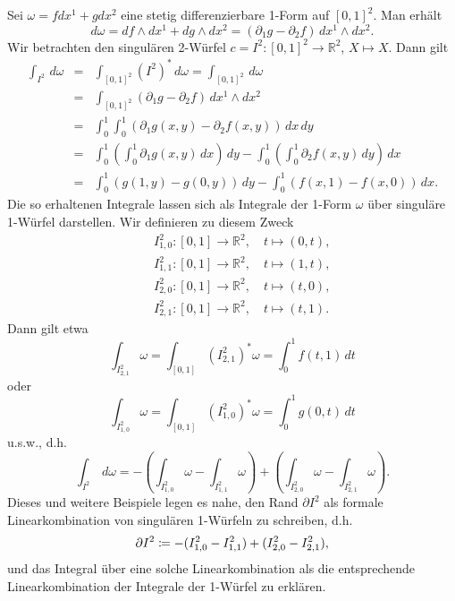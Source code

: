 \documentclass[a4paper,twoside,DIV15,BCOR12mm]{scrbook}
\begin{document}
\bigskip

 Sei $\omega = fdx^{1} + gdx^{2}$ eine stetig 
differenzierbare 1-Form auf $[0,1]^{2}$. Man erhält
\[ d\omega = df \wedge dx^{1} + dg \wedge dx^{2} = (\partial_{1} g - 
\partial_{2} f) \, dx^{1} \wedge dx^{2}. \]
Wir betrachten den singulären 2-Würfel $c = I^{2}: [0,1]^{2} \to 
{\mathbb R}^{2}$, $X \mapsto X$. Dann gilt
\begin{eqnarray*}
\int_{I^{2}} \, d\omega & = & \int_{[0,1]^{2}} (I^{2})^{*} \, 
d\omega = \int_{[0,1]^{2}} \, d\omega \\
& = & \int_{[0,1]^{2}} (\partial_{1}g - \partial_{2} f) \, dx^{1} 
\wedge dx^{2} \\
& = & \int_{0}^{1} \int_{0}^{1} (\partial_{1}g(x,y) - 
\partial_{2}f(x,y))\, dx\, dy \\
& = & \int_{0}^{1}\left(\int_{0}^{1} \partial_{1}g(x,y)\, dx \right)\, 
dy - \int_{0}^{1} \left(\int_{0}^{1} \partial_{2}f(x,y)\, dy \right) 
\, dx \\
& = & \int_{0}^{1}(g(1,y) - g(0,y))\, dy - \int_{0}^{1}(f(x,1) - 
f(x,0))\, dx .
\end{eqnarray*}
Die so erhaltenen Integrale lassen sich als Integrale der 1-Form 
$\omega$ über singuläre 1-Würfel darstellen. Wir definieren zu diesem Zweck
\begin{eqnarray*}
&   & I_{1,0}^{2}: [0,1] \to {\mathbb R}^{2}, \quad t \mapsto (0,t), \\
&   & I_{1,1}^{2}: [0,1] \to {\mathbb R}^{2}, \quad t \mapsto (1,t), \\
&   & I_{2,0}^{2}: [0,1] \to {\mathbb R}^{2}, \quad t \mapsto (t,0), \\
&   & I_{2,1}^{2}: [0,1] \to {\mathbb R}^{2}, \quad t \mapsto (t,1).
\end{eqnarray*}
Dann gilt etwa
\[ \int_{I_{2,1}^{2}} \omega = \int_{[0,1]} (I_{2,1}^{2})^{*} 
\omega = \int_{0}^{1}f(t,1)\, dt \]
oder
\[ \int_{I_{1,0}^{2}} \omega = \int_{[0,1]} (I_{1,0}^{2})^{*} 
\omega = \int_{0}^{1} g(0,t)\, dt \]
u.s.w., d.h.
\[ \int_{I^{2}} \, d\omega = - \left(\int_{I_{1,0}^{2}} \omega - 
\int_{I_{1,1}^{2}} \omega\right) + \left(\int_{I_{2,0}^{2}} \omega - 
\int_{I_{2,1}^{2}} \omega \right). \]
Dieses und weitere Beispiele legen es nahe, den Rand $\partial I^{2}$ 
als formale Linearkombination von singulären 1-Würfeln zu schreiben, d.h.
\[ \partial I^{2} \da  - (I_{1,0}^{2} - I_{1,1}^{2}) + (I_{2,0}^{2} - 
I_{2,1}^2), \]
und das Integral über eine solche Linearkombination als die 
entsprechende Linearkombination der Integrale der 1-Würfel zu erklären. \\
\end{document}
